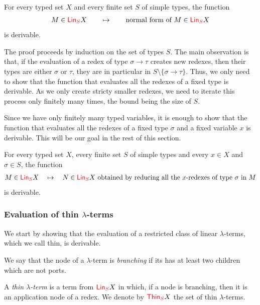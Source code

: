  \begin{proposition}\label{prop:one-register} 
    For every typed set $X$ and every finite set $S$ of simple types, the function 
    \begin{align*}
        M \in  {\color{red}{\mathsf{Lin}_{S}}} X \qquad \mapsto \qquad \text{normal form of $M$} \in  {\color{red}{\mathsf{Lin}_{S}}} X
    \end{align*}
    is derivable.
\end{proposition}

The proof proceeds by induction on the set of types $S$. The main observation is that, if the evaluation of a redex of type $\sigma\rightarrow \tau$ creates new redexes, then their types are either $\sigma$ or $\tau$, they are in particular in $S\setminus\{\sigma\rightarrow\tau\}$. Thus, we only need to show that the function that evaluates all the redexes of a fixed type is derivable. As we only create stricty smaller redexes, we need to iterate this process only finitely many times, the bound being the size of $S$. 

  Since we have only finitely many typed variables, it is enough to show that the function that evaluates all the redexes of a fixed type $\sigma$ and a fixed variable $x$ is derivable. This will be our goal in the rest of this section.

\begin{theorem}\label{thm:evalOneType}
 For every typed set $X$, every finite set $S$ of simple types and every $x\in X$ and $\sigma\in S$, the function 
    \begin{align*}
        M \in  {\color{red}{\mathsf{Lin}_{S}}} X \quad \mapsto \quad N \in {\color{red}{\mathsf{Lin}_{S}}} X \text{ obtained by reducing all the $x$-redexes of type $\sigma$ in $M$} 
    \end{align*}
    is derivable.
\end{theorem}



\subsubsection{Evaluation of thin $\lambda$-terms}

We start by showing that the evaluation of a restricted class of linear $\lambda$-terms, which we call thin, is derivable.   

\begin{definition}
We say that the node of a $\lambda$-term is \emph{branching} if its has at least two children which are not ports.
 
A \emph{thin $\lambda$-term} is a term from ${\color{red}{\mathsf{Lin}_{S}}} X$ in which, if a node is branching, then it is an application node of a redex. We denote by ${\color{red}{\mathsf{Thin}_{S}}} X$ the set of thin $\lambda$-terms.
\end{definition}

